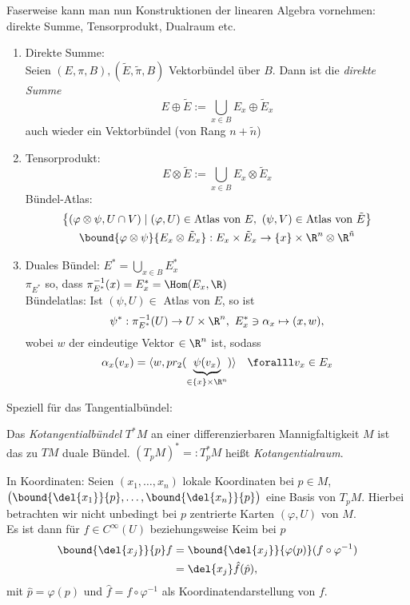 \lecture Faserweise kann man nun Konstruktionen der linearen Algebra vornehmen: direkte Summe, Tensorprodukt, Dualraum etc.

\begin{exmp}\label{3.18}
	\begin{enumerate}[label={\roman*})]
		\item Direkte Summe:\\
			Seien $ (E,\pi,B),(\tilde{E},\tilde{\pi},B) $ Vektorbündel über $B$. Dann ist die \emph{direkte Summe}
			\[ E \oplus \tilde{E} := \bigcup_{x \in B} E_x \oplus \tilde{E}_x \]
			auch wieder ein Vektorbündel (von Rang $n + \tilde{n}$)
		\item Tensorprodukt:
			\[ E \otimes \tilde{E} := \bigcup_{x \in B} E_x \otimes \tilde{E}_x \]
		Bündel-Atlas:
			\begin{gather*}
				\big\{ (\varphi \otimes \psi, U \cap V) \mid (\varphi,U) \in \text{Atlas von }E,\ (\psi,V) \in \text{Atlas von } \tilde{E} \big\}\\
				\bound{\varphi \otimes \psi}{E_x \otimes \tilde{E}_x} : E_x \times \tilde{E}_x \to \{x\} \times \R^n \otimes \R^{\tilde{n}}
			\end{gather*}
		\item Duales Bündel: $ E^* = \bigcup_{x \in B} E_x^* $\\
			$ \pi_{E^*} $ so, dass $ \pi_{E^*}^{-1} (x) = E_x^* = \Hom(E_x,\R) $\\
			Bündelatlas: Ist $ (\psi,U) \in $ Atlas von $E$, so ist 
			$$ \psi^*: \pi_{E^*}^{-1} (U) \to U \times \R^n,\ E_x^* \ni \alpha_x \mapsto (x,w),$$
				wobei $w$ der eindeutige Vektor $\in \R^n$ ist, sodass
			\[ \alpha_x (v_x) = \langle w,pr_2(\underbrace{\psi(v_x)}_{\in \{x\} \times \R^n}) \rangle \quad \foralll v_x  \in E_x \]
	\end{enumerate}
\end{exmp}

Speziell für das Tangentialbündel:

\begin{defn}[Kotangentialbündel]
	Das \emph{Kotangentialbündel} $T^*M$ an einer differenzierbaren Mannigfaltigkeit $M$ ist das zu $TM$ duale Bündel. $ (T_pM)^* =: T_p^*M $ heißt \emph{Kotangentialraum}.
\end{defn}

In Koordinaten: Seien $ (x_1,\dotsc,x_n) $ lokale Koordinaten bei $p \in M$, $ \big( \bound{\del{x_1}}{p},\dotsc, \bound{\del{x_n}}{p} \big) $ eine Basis von $T_pM$. Hierbei betrachten wir nicht unbedingt bei $p$ zentrierte Karten $ (\varphi,U) $ von $M$.\\
Es ist dann für $f \in C^\infty(U)$ beziehungsweise Keim bei $p$
\begin{align*}
	\bound{\del{x_j}}{p}f &= \bound{\del{x_j}}{\varphi(p)} (f \circ \varphi^{-1})\\
	&= \del{x_j} \hat{f} (\hat{p}),
\end{align*}
mit $\hat{p} = \varphi(p)$ und $\hat{f} = f \circ \varphi^{-1}$ als Koordinatendarstellung von $f$.


